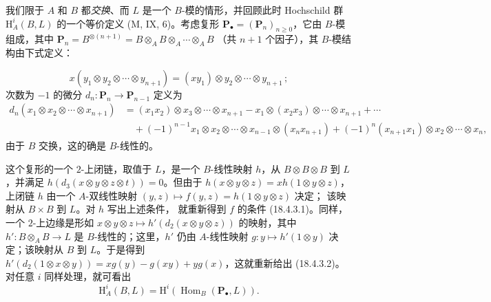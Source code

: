 \begin{env}[18.4.4]
\label{0.18.4.4-fr}
我们限于 $A$ 和 $B$ 都\emph{交换}、而 $L$ 是一个 $B$-模的情形，并回顾此时
Hochschild 群 $\mathrm H_A^i(B,L)$ 的一个等价定义 (M, IX, 6)。考虑复形
$\mathbf P_\bullet=(\mathbf P_n)_{n\geqslant0}$，它由 $B$-模组成，其中
$\mathbf P_n=B^{\otimes(n+1)}=B\otimes_A B\otimes_A\cdots\otimes_A B$
（共 $n+1$ 个因子），其 $B$-模结构由下式定义：


\[
  x(y_1\otimes y_2\otimes\cdots\otimes y_{n+1})
  =(xy_1)\otimes y_2\otimes\cdots\otimes y_{n+1}\,;
\]
次数为 $-1$ 的微分 $d_n:\mathbf P_n\to\mathbf P_{n-1}$ 定义为
\begin{align*}
  d_n(x_1\otimes x_2\otimes\cdots\otimes x_{n+1})
    &=(x_1x_2)\otimes x_3\otimes\cdots\otimes x_{n+1}
      -x_1\otimes(x_2x_3)\otimes\cdots\otimes x_{n+1}+\cdots\\
    &\quad+(-1)^{n-1}x_1\otimes x_2\otimes\cdots\otimes x_{n-1}
      \otimes(x_nx_{n+1})
      +(-1)^n(x_{n+1}x_1)\otimes x_2\otimes\cdots\otimes x_n,
\end{align*}
由于 $B$ 交换，这的确是 $B$-线性的。

这个复形的一个 $2$-上闭链，取值于 $L$，是一个 $B$-线性映射 $h$，从
$B\otimes B\otimes B$ 到 $L$，并满足
$h(d_3(x\otimes y\otimes z\otimes t))=0$。但由于
$h(x\otimes y\otimes z)=xh(1\otimes y\otimes z)$，上闭链 $h$ 由一个
$A$-双线性映射 $(y,z)\longmapsto f(y,z)=h(1\otimes y\otimes z)$ 决定；
该映射从 $B\times B$ 到 $L$。对 $h$ 写出上述条件，
就重新得到 $f$ 的条件 (18.4.3.1)。同样，一个 $2$-上边缘是形如
$x\otimes y\otimes z\longmapsto h'(d_2(x\otimes y\otimes z))$ 的映射，其中
$h':B\otimes_A B\to L$ 是 $B$-线性的；这里，$h'$ 仍由 $A$-线性映射
$g:y\longmapsto h'(1\otimes y)$ 决定；该映射从 $B$ 到 $L$。于是得到
$h'(d_2(1\otimes x\otimes y))=xg(y)-g(xy)+yg(x)$，这就重新给出
(18.4.3.2)。
对任意 $i$ 同样处理，就可看出
\begin{equation}
\label{0.18.4.4.1-fr}
\tag{18.4.4.1}
  \mathrm H_A^i(B,L)=\mathrm H^i(\operatorname{Hom}_B(\mathbf P_\bullet,L)).
\end{equation}
\end{env}

